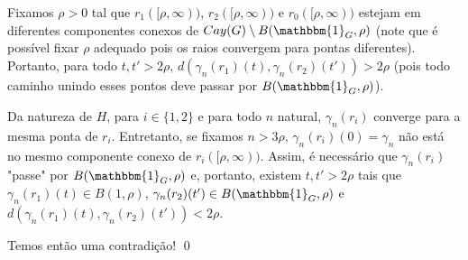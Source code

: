 \begin{theorem}
Fixamos $\rho > 0$ tal que $r_1([\rho, \infty))$, $r_2([\rho, \infty))$ e $r_0([\rho, \infty))$ estejam em diferentes componentes conexos de $Cay(G) \setminus B(\mathbbm{1}_G, \rho)$ (note que é possível fixar $\rho$ adequado pois os raios convergem para pontas diferentes). Portanto, para todo $t, t' > 2 \rho$, $d(\gamma_n(r_1)(t), \gamma_n(r_2)(t')) > 2\rho$ (pois todo caminho unindo esses pontos deve passar por $B(\mathbbm{1}_G, \rho)$).

Da natureza de $H$, para $i \in \{ 1,2\}$ e para todo $n$ natural, $\gamma_n(r_i)$ converge para a mesma ponta de $r_i$. Entretanto, se fixamos $n > 3 \rho$, $\gamma_n(r_i)(0) = \gamma_n$ não está no mesmo componente conexo de $r_i([\rho, \infty))$. Assim, é necessário que $\gamma_n(r_i)$ "passe" por $B(\mathbbm{1}_G, \rho)$ e, portanto, existem $t, t' > 2\rho$ tais que $\gamma_n(r_1)(t) \in B(1, \rho)$, $\gamma_n(r_2)(t') \in B(\mathbbm{1}_G, \rho)$ e $d(\gamma_n(r_1)(t), \gamma_n(r_2)(t')) < 2\rho$.

Temos então uma contradição!
\qed
\end{theorem}